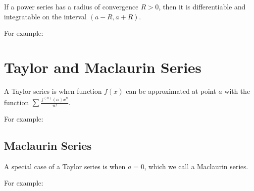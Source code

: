 \documentclass{article}
\begin{document}
If a power series has a radius of convergence $R > 0$, then it is
differentiable and integratable on the interval $(a-R,a+R)$.

For example:

\section{Taylor and Maclaurin Series}

A Taylor series is when function $f(x)$ can be approximated at point
$a$ with the function $\sum \frac{f^{(n)}(a)x^n}{n!}$.

For example:

\subsection{Maclaurin Series}

A special case of a Taylor series is when $a=0$, which we call a Maclaurin series.

For example:
\end{document}

